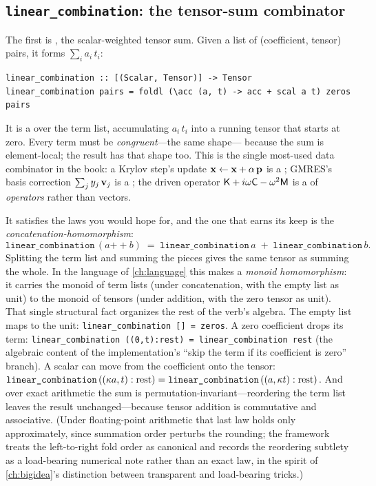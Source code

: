 \subsection{\texttt{linear\_combination}: the tensor-sum combinator}

The first is , the scalar-weighted tensor sum. Given a
list of (coefficient, tensor) pairs, it forms $\sum_i a_i\,t_i$:
\begin{lstlisting}[style=l4style]
linear_combination :: [(Scalar, Tensor)] -> Tensor
linear_combination pairs = foldl (\acc (a, t) -> acc + scal a t) zeros pairs
\end{lstlisting}
It is a  over the term list, accumulating $a_i\,t_i$ into a running
tensor that starts at zero. Every term must be \emph{congruent}---the same shape---
because the sum is element-local; the result has that shape too. This is the
single most-used data combinator in the book: a Krylov step's update
$\mathbf{x} \gets \mathbf{x} + \alpha\,\mathbf{p}$ is a ; GMRES's basis
correction $\sum_j y_j\,\mathbf{v}_j$ is a ; the driven
operator $\mathsf{K} + i\omega\mathsf{C} - \omega^2\mathsf{M}$ is a  of
\emph{operators} rather than vectors.

It satisfies the laws you would hope for, and the one that earns its keep is the
\emph{concatenation-homomorphism}:
\[
  \texttt{linear\_combination}\,(a \mathbin{+\!\!+} b)
    \;=\; \texttt{linear\_combination}\,a \;+\; \texttt{linear\_combination}\,b.
\]
Splitting the term list and summing the pieces gives the same tensor as summing the
whole. In the language of \cref{ch:language} this makes  a
\emph{monoid homomorphism}: it carries the monoid of term lists (under
concatenation, with the empty list as unit) to the monoid of tensors (under
addition, with the zero tensor as unit). That single structural fact organizes the
rest of the verb's algebra. The empty list maps to the unit:
\lstinline[style=l4style]|linear_combination [] = zeros|. A zero coefficient drops
its term: \lstinline[style=l4style]|linear_combination ((0,t):rest) = linear_combination rest|
(the algebraic content of the implementation's ``skip the term if its coefficient is
zero'' branch). A scalar can move from the coefficient onto the tensor:
$\texttt{linear\_combination}\,((\kappa a, t):\text{rest}) = \texttt{linear\_combination}\,((a, \kappa t):\text{rest})$.
And over exact arithmetic the sum is permutation-invariant---reordering the term
list leaves the result unchanged---because tensor addition is commutative and
associative. (Under floating-point arithmetic that last law holds only
approximately, since summation order perturbs the rounding; the framework treats
the left-to-right fold order as canonical and records the reordering subtlety as a
load-bearing numerical note rather than an exact law, in the spirit of
\cref{ch:bigidea}'s distinction between transparent and load-bearing tricks.)

